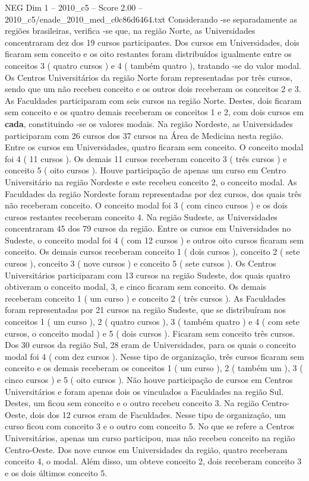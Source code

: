 \begin{textsample}{NEG Dim 1 – 2010\_c5 – Score 2.00 – 2010\_c5/enade\_2010\_med\_c0c86d6464.txt}
Considerando -se separadamente as regiões brasileiras, verifica -se que, na região Norte, as Universidades concentraram dez dos 19 cursos participantes.
Dos cursos em Universidades, dois ficaram sem conceito e os oito restantes foram distribuídos igualmente entre os conceitos 3 ( quatro cursos ) e 4 ( também quatro ), tratando -se do valor modal.
Os Centros Universitários da região Norte foram representadas por três cursos, sendo que um não recebeu conceito e os outros dois receberam os conceitos 2 e 3.
As Faculdades participaram com seis cursos na região Norte.
Destes, dois ficaram sem conceito e os quatro demais receberam os conceitos 1 e 2, com dois cursos em \textbf{cada}, constituindo -se os valores modais.
Na região Nordeste, as Universidades participaram com 26 cursos dos 37 cursos na Área de Medicina nesta região.
Entre os cursos em Universidades, quatro ficaram sem conceito.
O conceito modal foi 4 ( 11 cursos ).
Os demais 11 cursos receberam conceito 3 ( três cursos ) e conceito 5 ( oito cursos ).
Houve participação de apenas um curso em Centro Universitário na região Nordeste e este recebeu conceito 2, o conceito modal.
As Faculdades da região Nordeste foram representadas por dez cursos, dos quais três não receberam conceito.
O conceito modal foi 3 ( com cinco cursos ) e os dois cursos restantes receberam conceito 4.
Na região Sudeste, as Universidades concentraram 45 dos 79 cursos da região.
Entre os cursos em Universidades no Sudeste, o conceito modal foi 4 ( com 12 cursos ) e outros oito cursos ficaram sem conceito.
Os demais cursos receberam conceito 1 ( dois cursos ), conceito 2 ( sete cursos ), conceito 3 ( nove cursos ) e conceito 5 ( sete cursos ).
Os Centros Universitários participaram com 13 cursos na região Sudeste, dos quais quatro obtiveram o conceito modal, 3, e cinco ficaram sem conceito.
Os demais receberam conceito 1 ( um curso ) e conceito 2 ( três cursos ).
As Faculdades foram representadas por 21 cursos na região Sudeste, que se distribuíram nos conceitos 1 ( um curso ), 2 ( quatro cursos ), 3 ( também quatro ) e 4 ( com sete cursos, o conceito modal ) e 5 ( dois cursos ).
Ficaram sem conceito três cursos.
Dos 30 cursos da região Sul, 28 eram de Universidades, para os quais o conceito modal foi 4 ( com dez cursos ).
Nesse tipo de organização, três cursos ficaram sem conceito e os demais receberam os conceitos 1 ( um curso ), 2 ( também um ), 3 ( cinco cursos ) e 5 ( oito cursos ).
Não houve participação de cursos em Centros Universitários e foram apenas dois os vinculados a Faculdades na região Sul.
Destes, um ficou sem conceito e o outro recebeu conceito 3.
Na região Centro-Oeste, dois dos 12 cursos eram de Faculdades.
Nesse tipo de organização, um curso ficou com conceito 3 e o outro com conceito 5.
No que se refere a Centros Universitários, apenas um curso participou, mas não recebeu conceito na região Centro-Oeste.
Dos nove cursos em Universidades da região, quatro receberam conceito 4, o modal.
Além disso, um obteve conceito 2, dois receberam conceito 3 e os dois últimos conceito 5.

\end{textsample}
